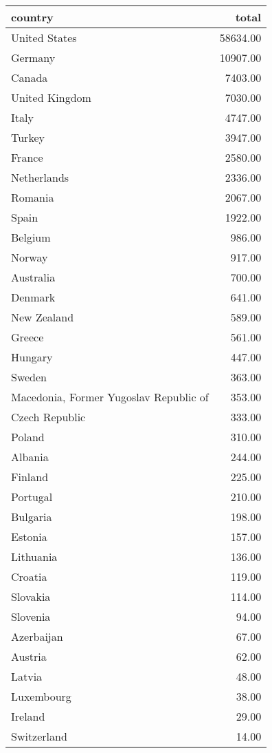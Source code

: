 \begin{table}[ht]
\centering
\begin{tabular}{lr}
  \hline
country & total \\ 
  \hline
United States & 58634.00 \\ 
  Germany & 10907.00 \\ 
  Canada & 7403.00 \\ 
  United Kingdom & 7030.00 \\ 
  Italy & 4747.00 \\ 
  Turkey & 3947.00 \\ 
  France & 2580.00 \\ 
  Netherlands & 2336.00 \\ 
  Romania & 2067.00 \\ 
  Spain & 1922.00 \\ 
  Belgium & 986.00 \\ 
  Norway & 917.00 \\ 
  Australia & 700.00 \\ 
  Denmark & 641.00 \\ 
  New Zealand & 589.00 \\ 
  Greece & 561.00 \\ 
  Hungary & 447.00 \\ 
  Sweden & 363.00 \\ 
  Macedonia, Former Yugoslav Republic of & 353.00 \\ 
  Czech Republic & 333.00 \\ 
  Poland & 310.00 \\ 
  Albania & 244.00 \\ 
  Finland & 225.00 \\ 
  Portugal & 210.00 \\ 
  Bulgaria & 198.00 \\ 
  Estonia & 157.00 \\ 
  Lithuania & 136.00 \\ 
  Croatia & 119.00 \\ 
  Slovakia & 114.00 \\ 
  Slovenia & 94.00 \\ 
  Azerbaijan & 67.00 \\ 
  Austria & 62.00 \\ 
  Latvia & 48.00 \\ 
  Luxembourg & 38.00 \\ 
  Ireland & 29.00 \\ 
  Switzerland & 14.00 \\ 

\end{tabular}
\end{table}
